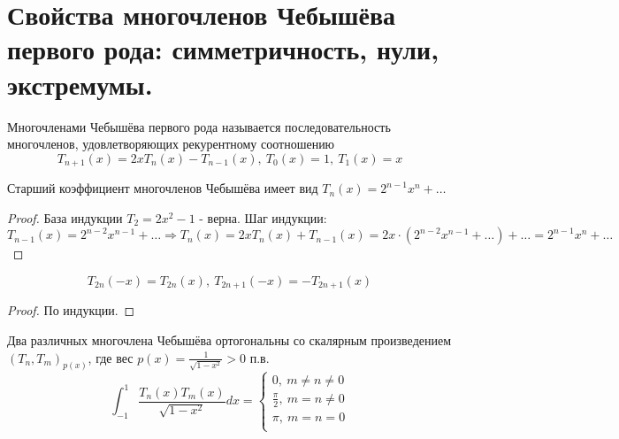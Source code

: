 \section{Свойства многочленов Чебышёва первого рода: симметричность, нули, экстремумы.}

\begin{definition}
  Многочленами Чебышёва первого рода называется последовательность
  многочленов, удовлетворяющих рекурентному соотношению
  \[T_{n+1}(x)=2xT_n(x)-T_{n-1}(x),\ T_0(x)=1,\ T_1(x)=x\]
\end{definition}

\begin{theorem}
  Старший коэффициент многочленов Чебышёва имеет вид $T_n(x)=2^{n-1}x^n+\ldots$
\end{theorem}

\begin{proof}
  База индукции $T_2=2x^2-1$ - верна. Шаг индукции:
  \[T_{n-1}(x)=2^{n-2}x^{n-1}+\ldots\Rightarrow T_n(x)=2xT_n(x)+T_{n-1}(x)=2x\cdot(2^{n-2}x^{n-1}+\ldots)+\ldots=2^{n-1}x^n+\ldots\]
\end{proof}

\begin{theorem}
  \[T_{2n}(-x)=T_{2n}(x),\ T_{2n+1}(-x)=-T_{2n+1}(x)\]
\end{theorem}

\begin{proof}
  По индукции.
\end{proof}

\begin{theorem} Два различных многочлена Чебышёва ортогональны
  со скалярным произведением $(T_n,T_m)_{p(x)}$, где вес $p(x)=\frac{1}{\sqrt{1-x^2}} > 0$ п.в.
  \[\int_{-1}^{1}\frac{T_n(x)T_m(x)}{\sqrt{1-x^2}}dx=\begin{cases}
      0,\ m\neq n\neq0         \\
      \frac{\pi}{2},\ m=n\neq0 \\
      \pi,\ m=n=0              \\
    \end{cases}\]
\end{theorem}

